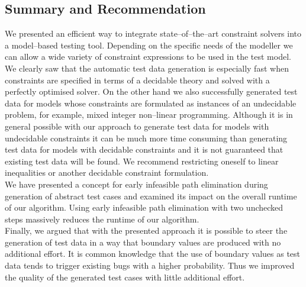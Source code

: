 \documentclass[runningheads,a4paper]{llncs}%
\begin{document}
\subsection{Summary and Recommendation}%
\label{sec:Recommendation}%
We presented an efficient way to integrate state--of--the--art constraint solvers into a model--based testing tool. Depending on the specific needs of the modeller we can allow a wide variety of constraint expressions to be used in the test model. We clearly saw that the automatic test data generation is especially fast when constraints are specified in terms of a decidable theory and solved with a perfectly optimised solver. On the other hand we also successfully generated test data for models whose constraints are formulated as instances of an undecidable problem, for example, mixed integer non--linear programming. Although it is in general possible with our approach to generate test data for models with undecidable constraints it can be much more time consuming than generating test data for models with decidable constraints and it is not guaranteed that existing test data will be found. We recommend restricting oneself to linear inequalities or another decidable constraint formulation.\\%
We have presented a concept for early infeasible path elimination during generation of abstract test cases and examined its impact on the overall runtime of our algorithm. Using early infeasible path elimination with two unchecked steps massively reduces the runtime of our algorithm.\\%
Finally, we argued that with the presented approach it is possible to steer the generation of test data in a way that boundary values are produced with no additional effort. It is common knowledge that the use of boundary values as test data tends to trigger existing bugs with a higher probability. Thus we improved the quality of the generated test cases with little additional effort.%
%
%
\end{document}
